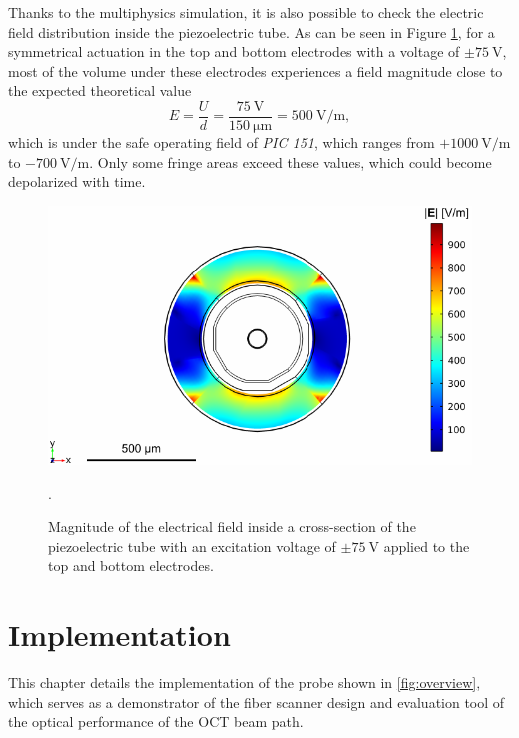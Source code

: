 \documentclass[10pt]{iopart}
\begin{document}
Thanks to the multiphysics simulation, it is also possible to check the electric field distribution inside the piezoelectric tube. As can be seen in Figure \ref{fig:field}, for a symmetrical actuation in the top and bottom electrodes with a voltage of $\pm \SI{75}{\volt}$, most of the volume under these electrodes experiences a field magnitude close to the expected theoretical value 
\begin{equation}
E= \frac{U}{d}  = \frac{\SI{75}{\volt}}{\SI{150}{\micro\meter}}  = \SI{500}{\volt/\meter},
\end{equation}
which is under the safe operating field of \textit{PIC 151}, which ranges from $ +\SI{1000}{\volt/\meter}$ to $ -\SI{700}{\volt/\meter}$. Only some fringe areas exceed these values, which could become depolarized with time.
\begin{figure}[h!]\centering
      \includegraphics[width=\columnwidth]{figures/field.pdf}
      \caption{Magnitude of the electrical field inside a cross-section of the piezoelectric tube with an excitation voltage of $\pm \SI{75}{\volt}$ applied to the top and bottom electrodes.}.
      \label{fig:field}
\end{figure}

\section{Implementation}
\label{Ch:Fab}	

This chapter details the implementation of the probe shown in \autoref{fig:overview}, which serves as a demonstrator of the fiber scanner design and evaluation tool of the optical performance of the OCT beam path.
\end{document}
